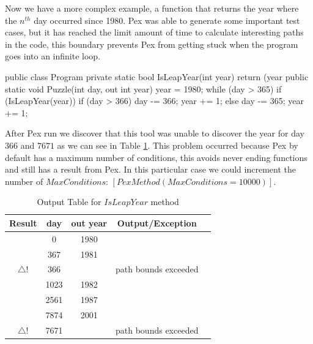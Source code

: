 \documentclass[10pt, conference, compsocconf]{IEEEtran}
\newcommand{\checkK}{\color{ForestGreen}\checkmark}
\newcommand{\bigexclaim}{\color{Dandelion}$\bigtriangleup$\hspace{-5.6pt}!}
\begin{document}
Now we have a more complex example, a function that returns the year where the $n^{th}$ day occurred since 1980.
Pex was able to generate some important test cases, but it has reached the limit amount of time to calculate interesting paths in the code,
this boundary prevents Pex from getting stuck when the program goes into
an infinite loop.

\begin{code}
public class Program {
  private static bool IsLeapYear(int year) {
    return (year %
  }
  public static void Puzzle(int day, out int year) {
    year = 1980;
    while (day > 365) {
      if (IsLeapYear(year)) {
        if (day > 366) {
          day -= 366;
          year += 1;
        }
      } else {
        day -= 365;
        year += 1;
      }
    }
  }
}
\end{code}

After Pex run we discover that this tool was unable to discover the year for day $366$ and $7671$ as we can see in Table \ref{tab:leap}.
This problem occurred because Pex by default has a maximum number of conditions, this avoids never ending functions and still has a result from Pex.
In this particular case we could increment the number of $MaxConditions$: $[PexMethod(MaxConditions=10000)]$.


\begin{table}[!ht]
\renewcommand{\arraystretch}{1.3}
\caption{Output Table for $IsLeapYear$ method}
\label{tab:leap}
\centering
\noindent \begin{tabular}{|c|c|c|c|c|}\hline
Result & day & out year & Output/Exception\\\hline
\checkK & 0 & 1980 & \\\hline
\checkK & 367 & 1981 & \\\hline
\bigexclaim & 366 & & path bounds exceeded\\\hline
\checkK & 1023 & 1982 &\\\hline
\checkK & 2561 & 1987 & \\\hline
\checkK & 7874 & 2001 & \\\hline
\bigexclaim &  7671 & & path bounds exceeded\\\hline
\end{tabular}
\end{table}
\end{document}
